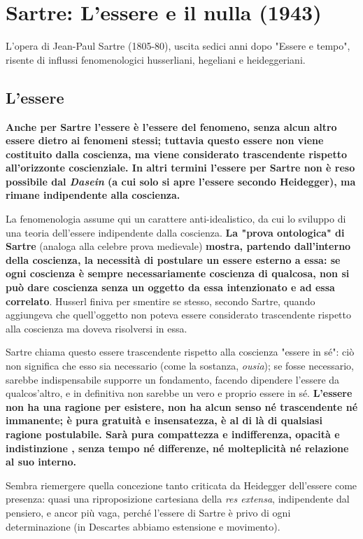 \section{Sartre: L'essere e il nulla (1943)}


L'opera di  Jean-Paul Sartre (1805-80), uscita sedici anni dopo
"Essere e tempo", risente di influssi fenomenologici husserliani,
hegeliani e heideggeriani.

\subsection{L'essere}

\textbf{Anche per Sartre l'essere è l'essere del fenomeno,
senza alcun altro essere dietro ai fenomeni stessi;
tuttavia questo essere non viene costituito dalla
coscienza, ma viene considerato trascendente rispetto
all'orizzonte coscienziale. In altri termini
l'essere per Sartre non è reso possibile dal
\textit{Dasein} (a cui solo si apre l'essere secondo Heidegger),
ma rimane indipendente alla coscienza.}

La fenomenologia assume qui un carattere
anti-idealistico, da cui lo sviluppo di una teoria
dell'essere indipendente dalla coscienza.
\textbf{La "prova ontologica" di Sartre} (analoga alla
celebre prova medievale)\textbf{ mostra, partendo dall'interno
della coscienza, la necessità di postulare un
essere esterno a essa: se ogni coscienza è sempre
necessariamente coscienza di qualcosa,
non si può dare coscienza senza un oggetto da essa
intenzionato e ad essa correlato}. Husserl finiva
per smentire se stesso, secondo Sartre, quando
aggiungeva che quell'oggetto non poteva essere considerato trascendente rispetto alla coscienza ma doveva
risolversi in essa.

Sartre chiama questo essere trascendente rispetto
alla coscienza "essere in sé": ciò non significa
che esso sia necessario (come la sostanza, \textit{ousia});
se fosse necessario, sarebbe indispensabile supporre
un fondamento, facendo dipendere l'essere da qualcos'altro, e in
definitiva non sarebbe un vero e proprio essere in sé.
\textbf{L'essere non ha una ragione per esistere, non
ha alcun senso né trascendente né immanente;
è pura gratuità e insensatezza, è al di là di
qualsiasi ragione postulabile. Sarà pura compattezza
e indifferenza, opacità e indistinzione , senza tempo
né differenze, né molteplicità né relazione al suo interno.}

Sembra riemergere quella concezione tanto criticata da
Heidegger dell'essere come presenza: quasi una
riproposizione cartesiana della \textit{res extensa},
indipendente dal pensiero, e ancor più vaga, perché
l'essere di Sartre è privo di ogni determinazione
(in Descartes abbiamo estensione e movimento).

